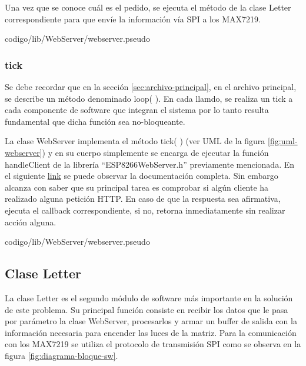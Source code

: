         Una vez que se conoce cuál es el pedido, se ejecuta el método de la clase Letter correspondiente para que envíe la información vía SPI a los MAX7219.
                         
        
                         {codigo/lib/WebServer/webserver.pseudo}
                         
                         
        \subsubsection{tick}
        Se debe recordar que en la sección \ref{sec:archivo-principal}, en el archivo principal, se describe un método denominado loop( ). En cada llamdo, se realiza un tick a cada componente de software que integran el sistema por lo tanto resulta fundamental que dicha función sea no-bloqueante.
    
        La clase WebServer implementa el método tick( ) (ver UML de la figura \ref{fig:uml-webserver}) y en su cuerpo simplemente se encarga de ejecutar la función handleClient de la librería ``ESP8266WebServer.h'' previamente mencionada. En el siguiente \href{https://github.com/esp8266/Arduino/blob/master/libraries/ESP8266WebServer/src/ESP8266WebServer.h}{link} se puede observar la documentación completa. Sin embargo alcanza con saber que su principal tarea es comprobar si algún cliente ha realizado alguna petición HTTP. En caso de que la respuesta sea afirmativa, ejecuta el callback correspondiente, si no, retorna inmediatamente sin realizar acción alguna.
    
        
                         {codigo/lib/WebServer/webserver.pseudo}
                         
                         
    \subsection{Clase Letter}
    La clase Letter es el segundo módulo de software más importante en la solución de este problema. Su principal función consiste en recibir los datos que le pasa por parámetro la clase WebServer, procesarlos y armar un buffer de salida con la información necesaria para encender las luces de la matriz. Para la comunicación con los MAX7219 se utiliza el protocolo de transmisión SPI como se observa en la figura \ref{fig:diagrama-bloque-sw}.

